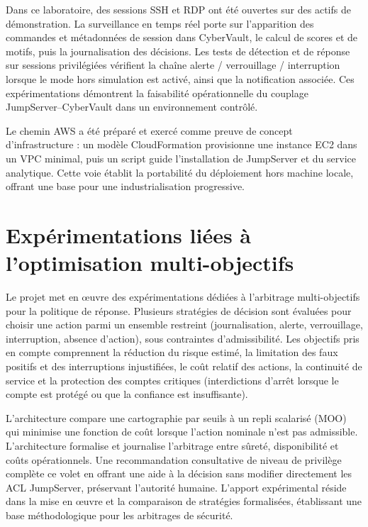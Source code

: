 \documentclass[11pt,a4paper,oneside]{report}
\theoremstyle{definition}
\theoremstyle{plain}
\begin{document}
Dans ce laboratoire, des sessions SSH et RDP ont été ouvertes sur des actifs
de démonstration. La surveillance en temps réel porte sur l'apparition des
commandes et métadonnées de session dans CyberVault, le calcul de scores et
de motifs, puis la journalisation des décisions. Les tests de détection et de
réponse sur sessions privilégiées vérifient la chaîne alerte / verrouillage /
interruption lorsque le mode hors simulation est activé, ainsi que la
notification associée. Ces expérimentations démontrent la faisabilité
opérationnelle du couplage JumpServer--CyberVault dans un environnement
contrôlé.

Le chemin AWS a été préparé et exercé comme preuve de concept d'infrastructure
: un modèle CloudFormation provisionne une instance EC2 dans un VPC minimal,
puis un script guide l'installation de JumpServer et du service analytique.
Cette voie établit la portabilité du déploiement hors machine locale, offrant
une base pour une industrialisation progressive.

\section{Expérimentations liées à l'optimisation multi-objectifs}
\label{sec:experiments-moo}

Le projet met en œuvre des expérimentations dédiées à l'arbitrage
multi-objectifs pour la politique de réponse. Plusieurs stratégies de
décision sont évaluées pour choisir une action parmi un ensemble restreint
(journalisation, alerte, verrouillage, interruption, absence d'action), sous
contraintes d'admissibilité. Les objectifs pris en compte comprennent la
réduction du risque estimé, la limitation des faux positifs et des
interruptions injustifiées, le coût relatif des actions, la continuité de
service et la protection des comptes critiques (interdictions d'arrêt lorsque
le compte est protégé ou que la confiance est insuffisante).

L'architecture compare une cartographie par seuils à un repli scalarisé (MOO)
qui minimise une fonction de coût lorsque l'action nominale n'est pas
admissible. L'architecture formalise et journalise l'arbitrage entre sûreté,
disponibilité et coûts opérationnels. Une recommandation consultative de
niveau de privilège complète ce volet en offrant une aide à la décision sans
modifier directement les ACL JumpServer, préservant l'autorité humaine.
L'apport expérimental réside dans la mise en œuvre et la comparaison de
stratégies formalisées, établissant une base méthodologique pour les
arbitrages de sécurité.
\end{document}
